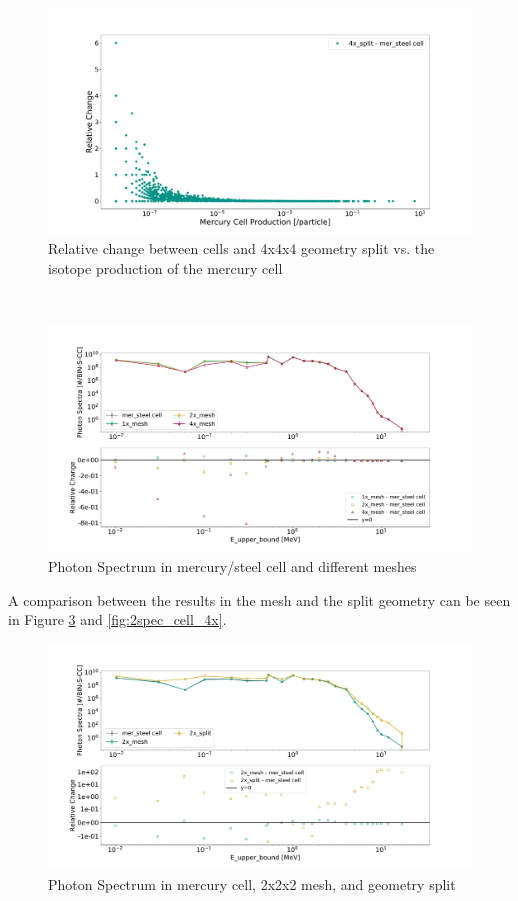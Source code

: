 \begin{figure}[h!]
 \centering
 \includegraphics[scale=0.4,trim={3cm 0.5cm 3cm 3cm},clip]{../figs/toy_p2/prod_VPII_rc_4x_split.pdf}
 \caption{Relative change between cells and 4x4x4 geometry split vs. the isotope production of the mercury cell}
 \label{fig:2prod_cell_4x_rc}
\end{figure}
%
\\
\begin{figure}[h!]
 \centering
 \includegraphics[scale=0.42,trim={2cm 0.5cm 3cm 2cm},clip]{../figs/toy_p2/spec_VPII_1x_2x_4x.pdf}
 \caption{Photon Spectrum in mercury/steel cell and different meshes}
 \label{fig:2spec_cell_1x_2x_4x}
\end{figure}
%
A comparison between the results in the mesh and the split geometry can be seen
in Figure \ref{fig:2spec_cell_2x} and \ref{fig:2spec_cell_4x}.
%
\begin{figure}[h!]
 \centering
 \includegraphics[scale=0.42,trim={2cm 0.5cm 3cm 2cm},clip]{../figs/toy_p2/spec_VPII_2x.pdf}
 \caption{Photon Spectrum in mercury cell, 2x2x2 mesh, and geometry split}
 \label{fig:2spec_cell_2x}
\end{figure}

